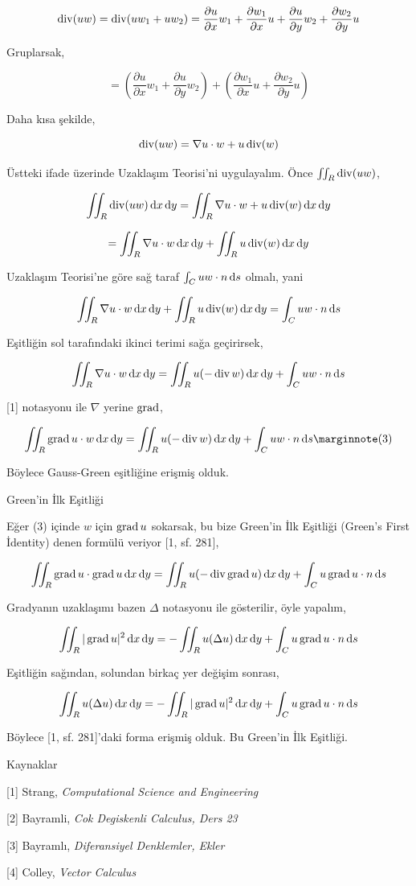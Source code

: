 \documentclass[12pt,fleqn]{article}\usepackage{../../common}
\begin{document}
$$
\operatorname{div} (uw) = \operatorname{div} (u w_1 + u w_2) =
\frac{\partial u}{\partial x} w_1 +
\frac{\partial w_1}{\partial x} u +
\frac{\partial u}{\partial y} w_2 +
\frac{\partial w_2}{\partial y} u 
$$

Gruplarsak,

$$
= \left( 
\frac{\partial u}{\partial x} w_1 +
\frac{\partial u}{\partial y} w_2 \right) +
\left( 
\frac{\partial w_1}{\partial x} u +
\frac{\partial w_2}{\partial y} u \right)
$$

Daha kısa şekilde,

$$
\operatorname{div} (uw) = \nabla u \cdot w + u \operatorname{div}(w)
$$

Üstteki ifade üzerinde Uzaklaşım Teorisi'ni uygulayalım. Önce
$\iint_R \operatorname{div} (uw)$,

$$
\iint_R \operatorname{div} (uw) \,\mathrm{d} x \,\mathrm{d} y= \iint_R \nabla u \cdot w + u \operatorname{div}(w) \,\mathrm{d} x \,\mathrm{d} y
$$

$$
= \iint_R \nabla u \cdot w  \,\mathrm{d} x \,\mathrm{d} y + \iint_R u \operatorname{div}(w) \,\mathrm{d} x \,\mathrm{d} y
$$

Uzaklaşım Teorisi'ne göre sağ taraf $\int_C uw \cdot n \,\mathrm{d} s$ olmalı, yani

$$
\iint_R \nabla u \cdot w  \,\mathrm{d} x \,\mathrm{d} y + \iint_R u \operatorname{div}(w) \,\mathrm{d} x \,\mathrm{d} y = \int_C uw \cdot n \,\mathrm{d} s
$$

Eşitliğin sol tarafındaki ikinci terimi sağa geçirirsek,

$$
\iint_R \nabla u \cdot w  \,\mathrm{d} x \,\mathrm{d} y =
\iint_R u (-\operatorname{div} w) \,\mathrm{d} x \,\mathrm{d} y + \int_C uw \cdot n \,\mathrm{d} s
$$

[1] notasyonu ile $\nabla$ yerine $\operatorname{grad}$,

$$
\iint_R \grad u \cdot w  \ud x \ud y =
\iint_R u (-\bdiv w) \ud x \ud y + \int_C uw \cdot n \ud s
\mlabel{3}
$$

Böylece Gauss-Green eşitliğine erişmiş olduk.

Green'in İlk Eşitliği 

Eğer (3) içinde $w$ için $\operatorname{grad} u$ sokarsak, bu bize Green'in İlk Eşitliği (Green's First
İdentity) denen formülü veriyor [1, sf. 281], 

$$
\iint_R \operatorname{grad} u \cdot \operatorname{grad} u  \,\mathrm{d} x \,\mathrm{d} y =
\iint_R u (-\operatorname{div} \operatorname{grad} u) \,\mathrm{d} x \,\mathrm{d} y + \int_C u \operatorname{grad} u \cdot n \,\mathrm{d} s
$$

Gradyanın uzaklaşımı bazen $\Delta$ notasyonu ile gösterilir, öyle yapalım,

$$
\iint_R | \operatorname{grad} u |^2  \,\mathrm{d} x \,\mathrm{d} y = - \iint_R u (\Delta u) \,\mathrm{d} x \,\mathrm{d} y +
\int_C u \operatorname{grad} u \cdot n \,\mathrm{d} s
$$

Eşitliğin sağından, solundan birkaç yer değişim sonrası,

$$
\iint_R u (\Delta u) \,\mathrm{d} x \,\mathrm{d} y =
- \iint_R | \operatorname{grad} u |^2  \,\mathrm{d} x \,\mathrm{d} y
+ \int_C u \operatorname{grad} u \cdot n \,\mathrm{d} s
$$

Böylece [1, sf. 281]'daki forma erişmiş olduk. Bu Green'in İlk Eşitliği.

Kaynaklar

[1] Strang, {\em Computational Science and Engineering}

[2] Bayramli, {\em Cok Degiskenli Calculus, Ders 23}

[3] Bayramlı, {\em Diferansiyel Denklemler, Ekler}

[4] Colley, {\em Vector Calculus}
\end{document}
